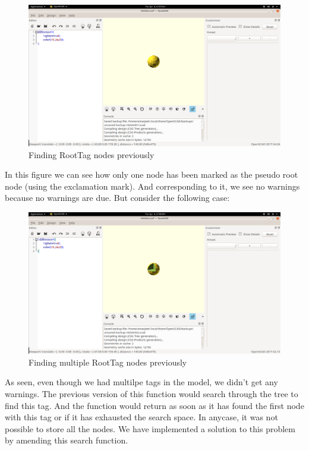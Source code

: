 \begin{figure}[H]
	\centering
	\includegraphics[width=\linewidth]{images/output/before_okay.png}
	\caption{Finding RootTag nodes previously}
\end{figure}
In this figure we can see how only one node has been marked as the pseudo root node (using the exclamation mark). And corresponding to it, we see no warnings because no warnings are due. But consider the following case:\\
\begin{figure}[H]
	\centering
	\includegraphics[width=\linewidth]{images/output/before_wrong.png}
	\caption{Finding multiple RootTag nodes previously}
\end{figure}
As seen, even though we had multilpe tags in the model, we didn't get any warnings.
The previous version of this function would search through the tree to find this tag. And the function would return as soon as it has found the first node with this tag or if it has exhausted the search space. In anycase, it was not possible to store all the nodes. We have implemented a solution to this problem by amending this search function.\\
